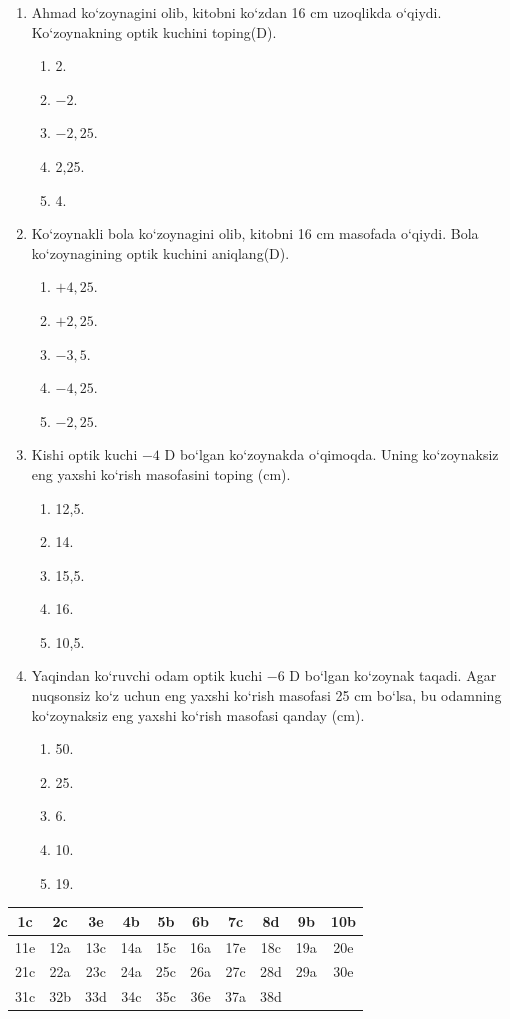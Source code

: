 \begin{enumerate}
\item Ahmad ko‘zoynagini olib, kitobni ko‘zdan 16 cm uzoqlikda o‘qiydi. Ko‘zoynakning optik kuchini toping(D).
\begin{enumerate}[label=\Alph*)]
\item 2.
\item $-2$.
\item $-2,25$.
\item 2,25.
\item 4.
\end{enumerate}

\item Ko‘zoynakli bola ko‘zoynagini olib, kitobni 16 cm masofada o‘qiydi. Bola ko‘zoynagining optik kuchini aniqlang(D).
\begin{enumerate}[label=\Alph*)]
\item $+4,25$.
\item $+2,25$.
\item $-3,5$.
\item $-4,25$.
\item $-2,25$.
\end{enumerate}

\item Kishi optik kuchi $-4$ D bo‘lgan ko‘zoynakda o‘qimoqda. Uning ko‘zoynaksiz eng yaxshi ko‘rish masofasini toping (cm).
\begin{enumerate}[label=\Alph*)]
\item 12,5.
\item 14.
\item 15,5.
\item 16.
\item 10,5.
\end{enumerate}

\item Yaqindan ko‘ruvchi odam optik kuchi $-6$ D bo‘lgan ko‘zoynak taqadi. Agar nuqsonsiz ko‘z uchun eng yaxshi ko‘rish masofasi 25 cm bo‘lsa, bu odamning ko‘zoynaksiz eng yaxshi ko‘rish masofasi qanday (cm).
\begin{enumerate}[label=\Alph*)]
\item 50.
\item 25.
\item 6.
\item 10.
\item 19.
\end{enumerate}

\end{enumerate}

\vspace{1em}

\begin{center}
\renewcommand{\arraystretch}{1.3}
\begin{tabular}{|c|c|c|c|c|c|c|c|c|c|}
\hline
1c & 2c & 3e & 4b & 5b & 6b & 7c & 8d & 9b & 10b \\
\hline
11e & 12a & 13c & 14a & 15c & 16a & 17e & 18c & 19a & 20e \\
\hline
21c & 22a & 23c & 24a & 25c & 26a & 27c & 28d & 29a & 30e \\
\hline
31c & 32b & 33d & 34c & 35c & 36e & 37a & 38d & & \\
\hline
\end{tabular}
\end{center}
